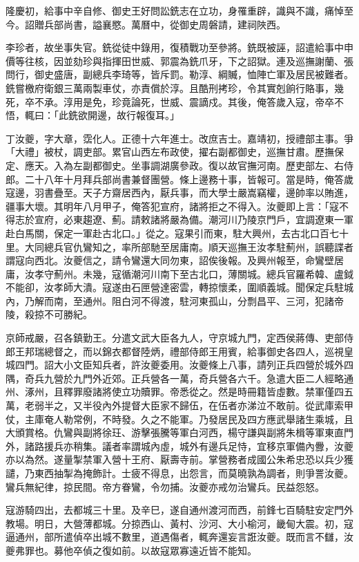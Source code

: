 \begin{pinyinscope}
隆慶初，給事中辛自修、御史王好問訟銑志在立功，身罹重辟，識與不識，痛悼至今。詔贈兵部尚書，謚襄愍。萬曆中，從御史周磐請，建祠陜西。

李珍者，故坐事失官。銑從徒中錄用，復積戰功至參將。銑既被誣，詔遣給事中申價等往核，因並劾珍與指揮田世威、郭震為銑爪牙，下之詔獄。連及巡撫謝蘭、張問行，御史盛唐，副總兵李琦等，皆斥罰。勒淳、綱贓，恤陣亡軍及居民被難者。銑嘗檄府衛銀三萬兩製車仗，亦責償於淳。且酷刑拷珍，令其實剋餉行賂事，幾死，卒不承。淳用是免，珍竟論死，世威、震謫戍。其後，俺答歲入寇，帝卒不悟，輒曰：「此銑欲開邊，故行報復耳。」

丁汝夔，字大章，霑化人。正德十六年進士。改庶吉士。嘉靖初，授禮部主事。爭「大禮」被杖，調吏部。累官山西左布政使，擢右副都御史，巡撫甘肅。歷撫保定、應天。入為左副都御史。坐事調湖廣參政。復以故官撫河南。歷吏部左、右侍郎。二十八年十月拜兵部尚書兼督團營。條上邊務十事，皆報可。當是時，俺答歲寇邊，羽書疊至。天子方齋居西內，厭兵事，而大學士嚴嵩竊權，邊帥率以賄進，疆事大壞。其明年八月甲子，俺答犯宣府，諸將拒之不得入。汝夔即上言：「寇不得志於宣府，必東趨遼、薊。請敕諸將嚴為備。潮河川乃陵京門戶，宜調遼東一軍赴白馬關，保定一軍赴古北口。」從之。寇果引而東，駐大興州，去古北口百七十里。大同總兵官仇鸞知之，率所部馳至居庸南。順天巡撫王汝孝駐薊州，誤聽諜者謂寇向西北。汝夔信之，請令鸞還大同勿東，詔俟後報。及興州報至，命鸞壁居庸，汝孝守薊州。未幾，寇循潮河川南下至古北口，薄關城。總兵官羅希韓、盧鉞不能卻，汝孝師大潰。寇遂由石匣營達密雲，轉掠懷柔，圍順義城。聞保定兵駐城內，乃解而南，至通州。阻白河不得渡，駐河東孤山，分剽昌平、三河，犯諸帝陵，殺掠不可勝紀。

京師戒嚴，召各鎮勤王。分遣文武大臣各九人，守京城九門，定西侯蔣傳、吏部侍郎王邦瑞總督之，而以錦衣都督陸炳，禮部侍郎王用賓，給事御史各四人，巡視皇城四門。詔大小文臣知兵者，許汝夔委用。汝夔條上八事，請列正兵四營於城外四隅，奇兵九營於九門外近郊。正兵營各一萬，奇兵營各六千。急遣大臣二人經略通州、涿州，且釋罪廢諸將使立功贖罪。帝悉從之。然是時冊籍皆虛數。禁軍僅四五萬，老弱半之，又半役內外提督大臣家不歸伍，在伍者亦涕泣不敢前。從武庫索甲仗，主庫奄人勒常例，不時發。久之不能軍。乃發居民及四方應武舉諸生乘城，且大頒賞格。仇鸞與副將徐玨、游擊張騰等軍白河西，楊守謙與副將朱楫等軍東直門外，諸路援兵亦稍集。議者率謂城內虛，城外有邊兵足恃，宜移京軍備內釁，汝夔亦以為然。遂量掣禁軍入營十王府、厭壽寺前。掌營務者成國公朱希忠恐以兵少獲譴，乃東西抽掣為掩飾計。士疲不得息，出怨言，而莫曉孰為調者，則爭詈汝夔。鸞兵無紀律，掠民間。帝方眷鸞，令勿捕。汝夔亦戒勿治鸞兵。民益怨怒。

寇游騎四出，去都城三十里。及辛巳，遂自通州渡河而西，前鋒七百騎駐安定門外教場。明日，大營薄都城。分掠西山、黃村、沙河、大小榆河，畿甸大震。初，寇逼通州，部所遣偵卒出城不數里，道遇傷者，輒奔還妄言誑汝夔。既而言不讎，汝夔弗罪也。募他卒偵之復如前。以故寇眾寡遠近皆不能知。


\end{pinyinscope}

